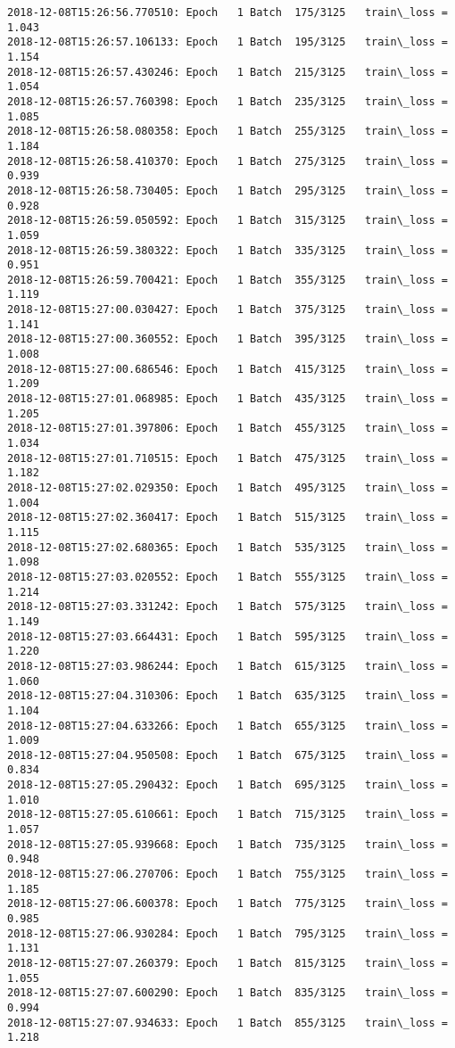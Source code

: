 \documentclass[11pt]{article}
\begin{document}
\begin{Verbatim}[commandchars=\\\{\}]
2018-12-08T15:26:56.770510: Epoch   1 Batch  175/3125   train\_loss = 1.043
2018-12-08T15:26:57.106133: Epoch   1 Batch  195/3125   train\_loss = 1.154
2018-12-08T15:26:57.430246: Epoch   1 Batch  215/3125   train\_loss = 1.054
2018-12-08T15:26:57.760398: Epoch   1 Batch  235/3125   train\_loss = 1.085
2018-12-08T15:26:58.080358: Epoch   1 Batch  255/3125   train\_loss = 1.184
2018-12-08T15:26:58.410370: Epoch   1 Batch  275/3125   train\_loss = 0.939
2018-12-08T15:26:58.730405: Epoch   1 Batch  295/3125   train\_loss = 0.928
2018-12-08T15:26:59.050592: Epoch   1 Batch  315/3125   train\_loss = 1.059
2018-12-08T15:26:59.380322: Epoch   1 Batch  335/3125   train\_loss = 0.951
2018-12-08T15:26:59.700421: Epoch   1 Batch  355/3125   train\_loss = 1.119
2018-12-08T15:27:00.030427: Epoch   1 Batch  375/3125   train\_loss = 1.141
2018-12-08T15:27:00.360552: Epoch   1 Batch  395/3125   train\_loss = 1.008
2018-12-08T15:27:00.686546: Epoch   1 Batch  415/3125   train\_loss = 1.209
2018-12-08T15:27:01.068985: Epoch   1 Batch  435/3125   train\_loss = 1.205
2018-12-08T15:27:01.397806: Epoch   1 Batch  455/3125   train\_loss = 1.034
2018-12-08T15:27:01.710515: Epoch   1 Batch  475/3125   train\_loss = 1.182
2018-12-08T15:27:02.029350: Epoch   1 Batch  495/3125   train\_loss = 1.004
2018-12-08T15:27:02.360417: Epoch   1 Batch  515/3125   train\_loss = 1.115
2018-12-08T15:27:02.680365: Epoch   1 Batch  535/3125   train\_loss = 1.098
2018-12-08T15:27:03.020552: Epoch   1 Batch  555/3125   train\_loss = 1.214
2018-12-08T15:27:03.331242: Epoch   1 Batch  575/3125   train\_loss = 1.149
2018-12-08T15:27:03.664431: Epoch   1 Batch  595/3125   train\_loss = 1.220
2018-12-08T15:27:03.986244: Epoch   1 Batch  615/3125   train\_loss = 1.060
2018-12-08T15:27:04.310306: Epoch   1 Batch  635/3125   train\_loss = 1.104
2018-12-08T15:27:04.633266: Epoch   1 Batch  655/3125   train\_loss = 1.009
2018-12-08T15:27:04.950508: Epoch   1 Batch  675/3125   train\_loss = 0.834
2018-12-08T15:27:05.290432: Epoch   1 Batch  695/3125   train\_loss = 1.010
2018-12-08T15:27:05.610661: Epoch   1 Batch  715/3125   train\_loss = 1.057
2018-12-08T15:27:05.939668: Epoch   1 Batch  735/3125   train\_loss = 0.948
2018-12-08T15:27:06.270706: Epoch   1 Batch  755/3125   train\_loss = 1.185
2018-12-08T15:27:06.600378: Epoch   1 Batch  775/3125   train\_loss = 0.985
2018-12-08T15:27:06.930284: Epoch   1 Batch  795/3125   train\_loss = 1.131
2018-12-08T15:27:07.260379: Epoch   1 Batch  815/3125   train\_loss = 1.055
2018-12-08T15:27:07.600290: Epoch   1 Batch  835/3125   train\_loss = 0.994
2018-12-08T15:27:07.934633: Epoch   1 Batch  855/3125   train\_loss = 1.218

\end{Verbatim}
\end{document}
